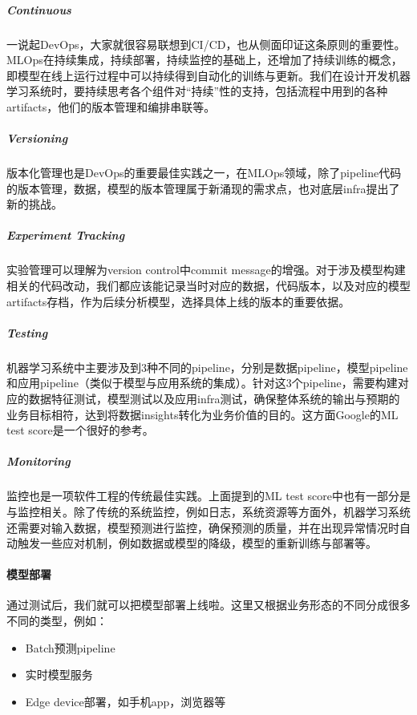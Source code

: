 \documentclass[letterpaper,11pt,english]{sphinxmanual}
\begin{document}
\subparagraph{Continuous}
\label{\detokenize{chapter_AI_dive/MLOps:continuous}}
一说起DevOps，大家就很容易联想到CI/CD，也从侧面印证这条原则的重要性。MLOps在持续集成，持续部署，持续监控的基础上，还增加了持续训练的概念，即模型在线上运行过程中可以持续得到自动化的训练与更新。我们在设计开发机器学习系统时，要持续思考各个组件对“持续”性的支持，包括流程中用到的各种artifacts，他们的版本管理和编排串联等。


\subparagraph{Versioning}
\label{\detokenize{chapter_AI_dive/MLOps:versioning}}
版本化管理也是DevOps的重要最佳实践之一，在MLOps领域，除了pipeline代码的版本管理，数据，模型的版本管理属于新涌现的需求点，也对底层infra提出了新的挑战。


\subparagraph{Experiment Tracking}
\label{\detokenize{chapter_AI_dive/MLOps:experiment-tracking}}
实验管理可以理解为version control中commit
message的增强。对于涉及模型构建相关的代码改动，我们都应该能记录当时对应的数据，代码版本，以及对应的模型artifacts存档，作为后续分析模型，选择具体上线的版本的重要依据。


\subparagraph{Testing}
\label{\detokenize{chapter_AI_dive/MLOps:testing}}
机器学习系统中主要涉及到3种不同的pipeline，分别是数据pipeline，模型pipeline和应用pipeline（类似于模型与应用系统的集成）。针对这3个pipeline，需要构建对应的数据特征测试，模型测试以及应用infra测试，确保整体系统的输出与预期的业务目标相符，达到将数据insights转化为业务价值的目的。这方面Google的ML
test score是一个很好的参考。


\subparagraph{Monitoring}
\label{\detokenize{chapter_AI_dive/MLOps:monitoring}}
监控也是一项软件工程的传统最佳实践。上面提到的ML test
score中也有一部分是与监控相关。除了传统的系统监控，例如日志，系统资源等方面外，机器学习系统还需要对输入数据，模型预测进行监控，确保预测的质量，并在出现异常情况时自动触发一些应对机制，例如数据或模型的降级，模型的重新训练与部署等。


\paragraph{模型部署}
\label{\detokenize{chapter_AI_dive/MLOps:id3}}
通过测试后，我们就可以把模型部署上线啦。这里又根据业务形态的不同分成很多不同的类型，例如：
\begin{itemize}
\item {} 
Batch预测pipeline

\item {} 
实时模型服务

\item {} 
Edge device部署，如手机app，浏览器等

\end{itemize}
\end{document}
